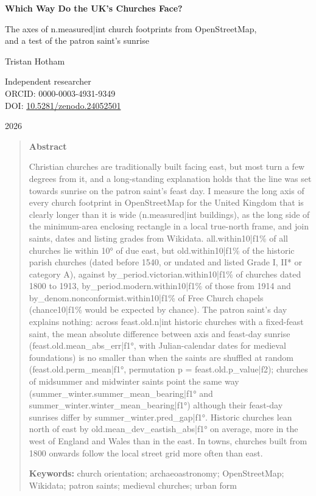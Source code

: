 \documentclass[11pt,a4paper]{article}
\begin{document}
\begin{center}
{\Large\bfseries Which Way Do the UK's Churches Face?\par}
\vspace{0.4em}
{\large The axes of {{n.measured|int}} church footprints from OpenStreetMap,\\and a test of the patron saint's sunrise\par}
\vspace{1.2em}
{\large Tristan Hotham\par}
\vspace{0.3em}
{\small Independent researcher\\
ORCID: 0000-0003-4931-9349\\
DOI: \href{https://doi.org/10.5281/zenodo.24052501}{10.5281/zenodo.24052501}\par}
\vspace{0.8em}
2026
\end{center}

\begin{quote}
\small
\begin{center}\textbf{Abstract}\end{center}
Christian churches are traditionally built facing east, but most turn a few degrees from it, and a long-standing explanation holds that the line was set towards sunrise on the patron saint's feast day. I measure the long axis of every church footprint in OpenStreetMap for the United Kingdom that is clearly longer than it is wide ({{n.measured|int}} buildings), as the long side of the minimum-area enclosing rectangle in a local true-north frame, and join saints, dates and listing grades from Wikidata. {{all.within10|f1}}\% of all churches lie within 10° of due east, but {{old.within10|f1}}\% of the historic parish churches (dated before 1540, or undated and listed Grade I, II* or category A), against {{by_period.victorian.within10|f1}}\% of churches dated 1800 to 1913, {{by_period.modern.within10|f1}}\% of those from 1914 and {{by_denom.nonconformist.within10|f1}}\% of Free Church chapels ({{chance10|f1}}\% would be expected by chance). The patron saint's day explains nothing: across {{feast.old.n|int}} historic churches with a fixed-feast saint, the mean absolute difference between axis and feast-day sunrise ({{feast.old.mean_abs_err|f1}}°, with Julian-calendar dates for medieval foundations) is no smaller than when the saints are shuffled at random ({{feast.old.perm_mean|f1}}°, permutation p = {{feast.old.p_value|f2}}); churches of midsummer and midwinter saints point the same way ({{summer_winter.summer_mean_bearing|f1}}° and {{summer_winter.winter_mean_bearing|f1}}°) although their feast-day sunrises differ by {{summer_winter.pred_gap|f1}}°. Historic churches lean north of east by {{old.mean_dev_eastish_abs|f1}}° on average, more in the west of England and Wales than in the east. In towns, churches built from 1800 onwards follow the local street grid more often than east.

\textbf{Keywords:} church orientation; archaeoastronomy; OpenStreetMap; Wikidata; patron saints; medieval churches; urban form
\end{quote}
\end{document}
